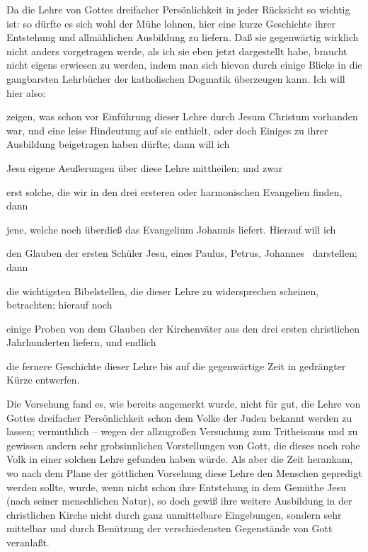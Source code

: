 Da die Lehre von Gottes dreifacher Persönlichkeit in jeder Rücksicht so wichtig ist: so dürfte es sich wohl der Mühe lohnen, hier eine kurze Geschichte ihrer Entstehung und allmählichen Ausbildung zu liefern.
Daß sie gegenwärtig wirklich nicht anders vorgetragen werde, als ich sie eben jetzt dargestellt habe, braucht nicht eigens erwiesen zu werden, indem man sich hievon durch einige Blicke in die gangbarsten Lehrbücher der katholischen Dogmatik überzeugen kann. Ich will hier also:
\begin{aufzb}
\item zeigen, was schon vor Einführung dieser Lehre durch Jesum Christum vorhanden war, und eine leise Hindeutung auf sie enthielt, oder doch Einiges zu ihrer Ausbildung beigetragen haben dürfte; dann will ich~\ 
\item Jesu eigene Aeußerungen über diese Lehre mittheilen; und zwar
\begin{aufzc}
\item erst solche, die wir in den drei ersteren oder harmonischen Evangelien finden, dann
\item jene, welche noch überdieß das Evangelium Johannis liefert. Hierauf will ich
\end{aufzc}
\item den Glauben der ersten Schüler Jesu, eines Paulus, Petrus, Johannes \uA\ darstellen; dann
\item die wichtigsten Bibelstellen, die dieser Lehre zu widersprechen scheinen, betrachten; hierauf noch
\item einige Proben von dem Glauben der Kirchenväter aus den drei ersten christlichen Jahrhunderten liefern, und endlich
\item die fernere Geschichte dieser Lehre bis auf die gegenwärtige Zeit in gedrängter Kürze entwerfen.
\end{aufzb}

Die Vorsehung fand es, wie bereits angemerkt wurde, nicht für gut, die Lehre von Gottes dreifacher Persönlichkeit schon dem Volke der Juden bekannt werden zu lassen; vermuthlich -- wegen der allzugroßen Versuchung zum Tritheismus und zu gewissen andern sehr grobsinnlichen Vorstellungen von Gott, die dieses noch rohe Volk in einer solchen Lehre gefunden haben würde. Als aber die Zeit herankam, wo nach dem Plane der göttlichen Vorsehung diese Lehre den Menschen gepredigt werden sollte, wurde, wenn nicht schon ihre Entstehung in dem Gemüthe Jesu (nach seiner menschlichen Natur), so doch gewiß ihre weitere Ausbildung in der christlichen Kirche nicht durch ganz unmittelbare Eingebungen, sondern sehr mittelbar und durch Benützung der verschiedensten Gegenstände von Gott veranlaßt.\par

